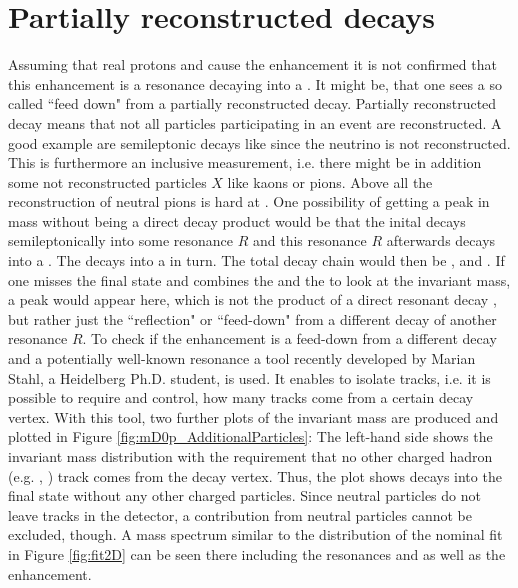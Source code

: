 \section{Partially reconstructed decays}
Assuming that real protons and \Dz cause the enhancement it is not confirmed that this enhancement is a resonance decaying into a \Dz\proton.
It might be, that one sees a so called ``feed down" from a partially reconstructed decay.
Partially reconstructed decay means that not all particles participating in an event are reconstructed.
A good example are semileptonic decays like \LbToDpmunuX since the neutrino is not reconstructed.
This is furthermore an inclusive measurement, i.e. there might be in addition some not reconstructed particles $X$ like kaons or pions.
Above all the reconstruction of neutral pions is hard at \lhcb.
One possibility of getting a peak in \Dz\proton mass without being a direct decay product would be that the inital \Lb decays semileptonically into some resonance $R$ and this resonance $R$ afterwards decays into a \Dstar\proton.
The \Dstar decays into a \D\pion in turn.
The total decay chain would then be ,  and \decay{\Dstar}{\D\pion}.
If one misses the final state \pion and combines the \D and the \proton to look at the invariant \D\proton mass, a peak would appear here, which is not the product of a direct resonant decay , but rather just the ``reflection" or ``feed-down" from a different decay of another resonance $R$.
To check if the enhancement is a feed-down from a different decay and a potentially well-known resonance a tool recently developed by Marian Stahl, a Heidelberg Ph.D. student, is used.
It enables to isolate tracks, i.e. it is possible to require and control, how many tracks come from a certain decay vertex.
With this tool, two further plots of the \Dz\proton invariant mass are produced and plotted in Figure \ref{fig:mD0p_AdditionalParticles}:
The left-hand side shows the invariant \Dz\proton mass distribution with the requirement that no other charged hadron (e.g. \pion, \kaon) track comes from the \Dz\proton\mun decay vertex.
Thus, the plot shows \Lb decays into the \Dz\proton\mun final state without any other charged particles.
Since neutral particles do not leave tracks in the detector, a contribution from neutral particles cannot be excluded, though.
A \Dz\proton mass spectrum similar to the distribution of the nominal fit in Figure \ref{fig:fit2D} can be seen there including the resonances \LcResI and \LcResII as well as the enhancement.
